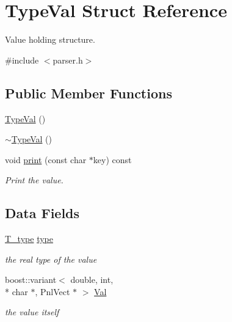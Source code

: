 \hypertarget{structTypeVal}{\section{Type\-Val Struct Reference}
\label{structTypeVal}
}


Value holding structure.  




{\ttfamily \#include $<$parser.\-h$>$}

\subsection*{Public Member Functions}
\begin{DoxyCompactItemize}
\item 
\hyperlink{structTypeVal_a584555ce9b88dfa20ab05d15980dcaf9}{Type\-Val} ()
\item 
\hyperlink{structTypeVal_a99d6508946d07b5a4cc7b2419c838445}{$\sim$\-Type\-Val} ()
\item 
void \hyperlink{structTypeVal_a003a13a4621d20a1e53df08c552952be}{print} (const char $\ast$key) const 
\begin{DoxyCompactList}\small\item\em Print the value. \end{DoxyCompactList}\end{DoxyCompactItemize}
\subsection*{Data Fields}
\begin{DoxyCompactItemize}
\item 
\hyperlink{parser_8h_a90856b8fb3f1a65845ffec1ec2884c0f}{T\-\_\-type} \hyperlink{structTypeVal_abd5dd71d2a5e2ce2f3b1f018068108ff}{type}
\begin{DoxyCompactList}\small\item\em the real type of the value \end{DoxyCompactList}\item 
boost\-::variant$<$ double, int, \\*
char $\ast$, Pnl\-Vect $\ast$ $>$ \hyperlink{structTypeVal_ab820b6ecfdebfcad3ecd99facbdcaed4}{Val}
\begin{DoxyCompactList}\small\item\em the value itself \end{DoxyCompactList}\end{DoxyCompactItemize}


